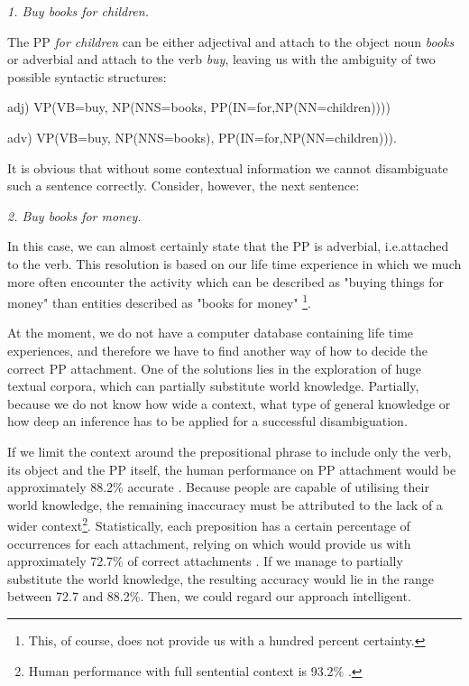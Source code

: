 \begin{center}
{\it 1. Buy books for children.  }
\end{center}

The PP {\it for children} can be either adjectival and attach to the object noun {\it books} or adverbial and attach to the verb {\it buy}, leaving us with the ambiguity of two possible syntactic structures:

\begin{center}
adj) VP(VB=buy, NP(NNS=books, PP(IN=for,NP(NN=children))))

adv) VP(VB=buy, NP(NNS=books), PP(IN=for,NP(NN=children))).
\end{center}

It is obvious that without some contextual information we cannot disambiguate such a sentence correctly. Consider, however, the next sentence: 

\begin{center}
{\it 2. Buy books for money.  }
\end{center}

In this case, we can almost certainly state that the PP is adverbial, i.e.attached to the verb. This resolution is based on our life time experience in which we much more often encounter the activity which can be described as "buying things for money" than entities described as "books for money"
\footnote{This, of course, does not provide us with a hundred percent certainty.}. 

At the moment, we do not have a computer database containing life time experiences, and therefore we have to find another way of how to decide the correct PP attachment. One of the solutions lies in the exploration of huge textual corpora, which can partially substitute world knowledge. Partially, because we do not know how wide a context, what type of general knowledge or how deep an inference has to be applied for a successful disambiguation.

If we limit the context around the prepositional phrase to include only the verb, its object and the PP itself, the human performance on PP attachment would be approximately 88.2\% accurate \cite{RRR94}. Because people are capable of utilising their world knowledge, the remaining inaccuracy must be attributed to the lack of a wider context\footnote{Human performance with full sentential context is 93.2\% \cite{RRR94}.}. Statistically, each preposition has a certain percentage of occurrences for each attachment, relying on which would provide us with approximately 72.7\% of correct attachments \cite{CandB95}. If we manage to partially substitute the world knowledge, the resulting accuracy would lie in the range between 72.7 and 88.2\%. Then, we could regard our approach intelligent.

